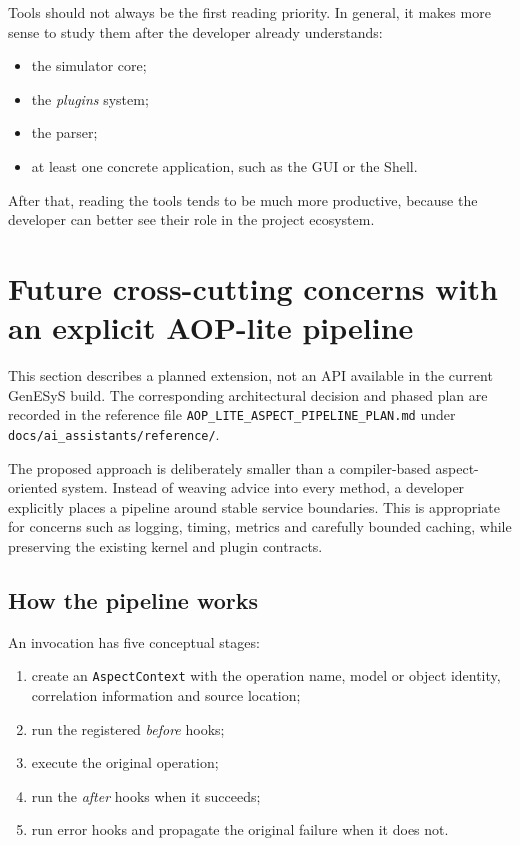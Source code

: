 Tools should not always be the first reading priority. In general, it makes more sense to study them after the developer already understands:
\begin{itemize}
 \item the simulator core;
 \item the \textit{plugins} system;
 \item the parser;
 \item at least one concrete application, such as the GUI or the Shell.
\end{itemize}

After that, reading the tools tends to be much more productive, because the developer can better see their role in the project ecosystem.

\section{Future cross-cutting concerns with an explicit AOP-lite pipeline}
\label{sec:cap10_aop_lite_pipeline}

This section describes a planned extension, not an API available in the
current GenESyS build. The corresponding architectural decision and phased
plan are recorded in the reference file
\texttt{AOP\_LITE\_ASPECT\_PIPELINE\_PLAN.md} under
\texttt{docs/ai\_assistants/reference/}.

The proposed approach is deliberately smaller than a compiler-based
aspect-oriented system. Instead of weaving advice into every method, a
developer explicitly places a pipeline around stable service boundaries. This
is appropriate for concerns such as logging, timing, metrics and carefully
bounded caching, while preserving the existing kernel and plugin contracts.

\subsection{How the pipeline works}

An invocation has five conceptual stages:

\begin{enumerate}
 \item create an \texttt{AspectContext} with the operation name, model or
       object identity, correlation information and source location;
 \item run the registered \textit{before} hooks;
 \item execute the original operation;
 \item run the \textit{after} hooks when it succeeds;
 \item run error hooks and propagate the original failure when it does not.
\end{enumerate}

